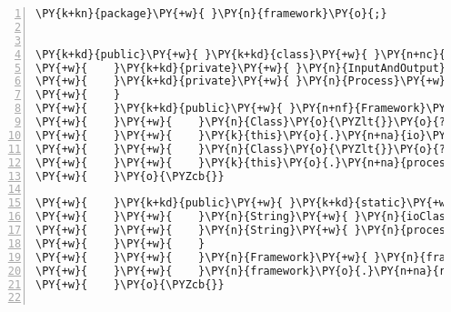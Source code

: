 \begin{Verbatim}[commandchars=\\\{\},numbers=left,firstnumber=1,stepnumber=1,frame=single,fontsize=\small]
\PY{k+kn}{package}\PY{+w}{ }\PY{n}{framework}\PY{o}{;}


\PY{k+kd}{public}\PY{+w}{ }\PY{k+kd}{class}\PY{+w}{ }\PY{n+nc}{Framework}\PY{+w}{ }\PY{o}{\PYZob{}}
\PY{+w}{    }\PY{k+kd}{private}\PY{+w}{ }\PY{n}{InputAndOutput}\PY{+w}{ }\PY{n}{io}\PY{o}{;}
\PY{+w}{    }\PY{k+kd}{private}\PY{+w}{ }\PY{n}{Process}\PY{+w}{ }\PY{n}{process}\PY{o}{;}
\PY{+w}{    }
\PY{+w}{    }\PY{k+kd}{public}\PY{+w}{ }\PY{n+nf}{Framework}\PY{o}{(}\PY{n}{String}\PY{+w}{ }\PY{n}{ioClass}\PY{o}{,}\PY{+w}{ }\PY{n}{String}\PY{+w}{ }\PY{n}{processClass}\PY{o}{)}\PY{+w}{ }\PY{k+kd}{throws}\PY{+w}{ }\PY{n}{ClassNotFoundException}\PY{o}{,}\PY{+w}{ }\PY{n}{InstantiationException}\PY{o}{,}\PY{+w}{ }\PY{n}{IllegalAccessException}\PY{+w}{ }\PY{o}{\PYZob{}}
\PY{+w}{    }\PY{+w}{    }\PY{n}{Class}\PY{o}{\PYZlt{}}\PY{o}{?}\PY{o}{\PYZgt{}}\PY{+w}{ }\PY{n}{io}\PY{+w}{ }\PY{o}{=}\PY{+w}{ }\PY{n}{Class}\PY{o}{.}\PY{n+na}{forName}\PY{o}{(}\PY{n}{ioClass}\PY{o}{)}\PY{o}{;}
\PY{+w}{    }\PY{+w}{    }\PY{k}{this}\PY{o}{.}\PY{n+na}{io}\PY{+w}{ }\PY{o}{=}\PY{+w}{ }\PY{o}{(}\PY{n}{InputAndOutput}\PY{o}{)}\PY{+w}{ }\PY{n}{io}\PY{o}{.}\PY{n+na}{newInstance}\PY{o}{(}\PY{o}{)}\PY{o}{;}
\PY{+w}{    }\PY{+w}{    }\PY{n}{Class}\PY{o}{\PYZlt{}}\PY{o}{?}\PY{o}{\PYZgt{}}\PY{+w}{ }\PY{n}{process}\PY{+w}{ }\PY{o}{=}\PY{+w}{ }\PY{n}{Class}\PY{o}{.}\PY{n+na}{forName}\PY{o}{(}\PY{n}{processClass}\PY{o}{)}\PY{o}{;}
\PY{+w}{    }\PY{+w}{    }\PY{k}{this}\PY{o}{.}\PY{n+na}{process}\PY{+w}{ }\PY{o}{=}\PY{+w}{ }\PY{o}{(}\PY{n}{Process}\PY{o}{)}\PY{+w}{ }\PY{n}{process}\PY{o}{.}\PY{n+na}{newInstance}\PY{o}{(}\PY{o}{)}\PY{o}{;}
\PY{+w}{    }\PY{o}{\PYZcb{}}

\PY{+w}{    }\PY{k+kd}{public}\PY{+w}{ }\PY{k+kd}{static}\PY{+w}{ }\PY{k+kt}{void}\PY{+w}{ }\PY{n+nf}{main}\PY{o}{(}\PY{n}{String}\PY{o}{[}\PY{o}{]}\PY{+w}{ }\PY{n}{args}\PY{o}{)}\PY{+w}{ }\PY{k+kd}{throws}\PY{+w}{ }\PY{n}{Exception}\PY{+w}{ }\PY{o}{\PYZob{}}
\PY{+w}{    }\PY{+w}{    }\PY{n}{String}\PY{+w}{ }\PY{n}{ioClass}\PY{+w}{ }\PY{o}{=}\PY{+w}{ }\PY{n}{args}\PY{o}{[}\PY{l+m+mi}{0}\PY{o}{]}\PY{o}{;}
\PY{+w}{    }\PY{+w}{    }\PY{n}{String}\PY{+w}{ }\PY{n}{processClass}\PY{+w}{ }\PY{o}{=}\PY{+w}{ }\PY{n}{args}\PY{o}{[}\PY{l+m+mi}{1}\PY{o}{]}\PY{o}{;}
\PY{+w}{    }\PY{+w}{    }
\PY{+w}{    }\PY{+w}{    }\PY{n}{Framework}\PY{+w}{ }\PY{n}{framework}\PY{+w}{ }\PY{o}{=}\PY{+w}{ }\PY{k}{new}\PY{+w}{ }\PY{n}{Framework}\PY{o}{(}\PY{n}{ioClass}\PY{o}{,}\PY{+w}{ }\PY{n}{processClass}\PY{o}{)}\PY{o}{;}
\PY{+w}{    }\PY{+w}{    }\PY{n}{framework}\PY{o}{.}\PY{n+na}{run}\PY{o}{(}\PY{o}{)}\PY{o}{;}
\PY{+w}{    }\PY{o}{\PYZcb{}}


\end{Verbatim}
